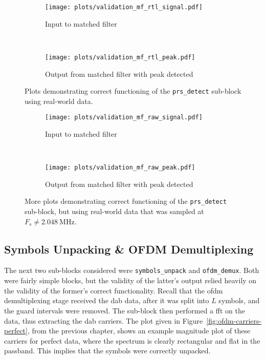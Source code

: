 \documentclass[class=report,11pt,crop=false]{standalone}
\begin{document}
\begin{figure}[htbp]
  \centering
  \captionsetup{type=figure}
  \begin{subfigure}[t]{\textwidth}
    \centering
    \captionsetup{type=figure}
    \texttt{[image: plots/validation\_mf\_rtl\_signal.pdf]}
    \caption{Input to matched filter}
    \label{fig:validation_mf_rtl_signal}
  \end{subfigure}%
  \\
  \begin{subfigure}[t]{\textwidth}
    \centering
    \captionsetup{type=figure}
    \texttt{[image: plots/validation\_mf\_rtl\_peak.pdf]}
    \caption{Output from matched filter with peak detected}
    \label{fig:validation_mf_rtl_peak}
  \end{subfigure}
  \caption{Plots demonstrating correct functioning of the \texttt{prs\_detect} sub-block using real-world data.}
  \label{fig:validation_mf_rtl}
\end{figure}

\begin{figure}[htbp]
  \centering
  \captionsetup{type=figure}
  \begin{subfigure}[t]{\textwidth}
    \centering
    \captionsetup{type=figure}
    \texttt{[image: plots/validation\_mf\_raw\_signal.pdf]}
    \caption{Input to matched filter}
    \label{fig:validation_mf_raw_signal}
  \end{subfigure}%
  \\
  \begin{subfigure}[t]{\textwidth}
    \centering
    \captionsetup{type=figure}
    \texttt{[image: plots/validation\_mf\_raw\_peak.pdf]}
    \caption{Output from matched filter with peak detected}
    \label{fig:validation_mf_raw_peak}
  \end{subfigure}
  \caption{More plots demonstrating correct functioning of the \texttt{prs\_detect} sub-block, but using real-world data that was sampled at \(F_s \ne \SI{2.048}{\mega\hertz}\).}
  \label{fig:validation_mf_raw}
\end{figure}

\subsection{Symbols Unpacking \& OFDM Demultiplexing}
The next two sub-blocks considered were \texttt{symbols\_unpack} and \texttt{ofdm\_demux}. Both were fairly simple blocks, but the validity of the latter's output relied heavily on the validity of the former's correct functionality. Recall that the \gls{ofdm} demultiplexing stage received the \gls{dab} data, after it was split into \(L\) symbols, and the guard intervals were removed. The sub-block then performed a \gls{fft} on the data, thus extracting the \gls{dab} carriers. The plot given in Figure~\ref{fig:ofdm-carriers-perfect}, from the previous chapter, shows an example magnitude plot of these carriers for perfect data, where the spectrum is clearly rectangular and flat in the passband. This implies that the symbols were correctly unpacked.
\end{document}
